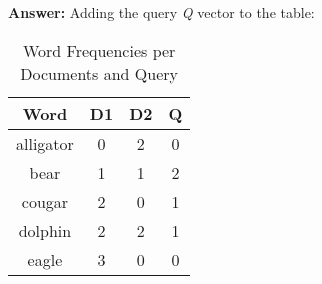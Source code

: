 \documentclass[11pt]{article}
\begin{document}
\begin{enumerate}
        \textbf{Answer:} Adding the query \textit{Q} vector to the table:
        \begin{table}[htbp]
            \begin{center}
                \caption{Word Frequencies per Documents and Query}
                \begin{tabular}{| c | c | c | c |}
                \hline
                \textbf{Word} & \textbf{D1} & \textbf{D2} & Q  \\
                \hline
                alligator   & 0 & 2 & 0 \\
                \hline
                bear        & 1 & 1 & 2 \\
                \hline
                cougar      & 2 & 0 & 1 \\
                \hline
                dolphin     & 2 & 2 & 1 \\
                \hline
                eagle       & 3 & 0 & 0 \\
                \hline
                \end{tabular}
            \end{center}
        \end{table}
        \clearpage
        \newpage


\end{enumerate}
\end{document}
